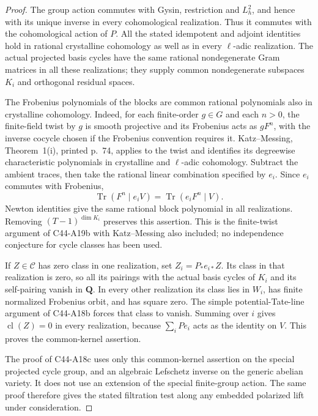 \documentclass[11pt]{article}
\theoremstyle{remark}\newtheorem{remark}[theorem]{Remark}
\begin{document}
\begin{proof}
The group action commutes with Gysin, restriction and
$L_h^2$, and hence with its unique inverse in every
cohomological realization. Thus it commutes with the
cohomological action of $P$. All the stated idempotent
and adjoint identities hold in rational crystalline
cohomology as well as in every $\ell$-adic realization.
The actual projected basis cycles have the same rational
nondegenerate Gram matrices in all these realizations;
they supply common nondegenerate subspaces $K_i$ and
orthogonal residual spaces.

The Frobenius polynomials of the blocks are common rational
polynomials also in crystalline cohomology. Indeed, for
each finite-order $g\in G$ and each $n>0$, the finite-field
twist by $g$ is smooth projective and its Frobenius acts
as $gF^n$, with the inverse cocycle chosen if the Frobenius
convention requires it. Katz--Messing, Theorem~1(i),
printed p.~74, applies to the twist and identifies its
degreewise characteristic polynomials in crystalline and
$\ell$-adic cohomology. Subtract the ambient traces, then
take the rational linear combination specified by $e_i$.
Since $e_i$ commutes with Frobenius,
\[
  \operatorname{Tr}(F^n\mid e_iV)
       =\operatorname{Tr}(e_iF^n\mid V).
\]
Newton identities give the same rational block polynomial
in all realizations. Removing $(T-1)^{\dim K_i}$ preserves
this assertion. This is the finite-twist argument of
C44-A19b with Katz--Messing also included; no independence
conjecture for cycle classes has been used.

If $Z\in\mathscr C$ has zero class in one realization,
set $Z_i=P_*e_{i*}Z$. Its class in that realization is
zero, so all its pairings with the actual basis cycles
of $K_i$ and its self-pairing vanish in $\mathbf Q$.
In every other realization its class lies in $W_i$,
has finite normalized Frobenius orbit, and has square
zero. The simple potential-Tate-line argument of
C44-A18b forces that class to vanish. Summing over $i$
gives $\operatorname{cl}(Z)=0$ in every realization,
because $\sum_i P e_i$ acts as the identity on $V$.
This proves the common-kernel assertion.

The proof of C44-A18c uses only this common-kernel
assertion on the special projected cycle group, and
an algebraic Lefschetz inverse on the generic abelian
variety. It does not use an extension of the special
finite-group action. The same proof therefore gives
the stated filtration test along any embedded polarized
lift under consideration.
\end{proof}
\end{document}
